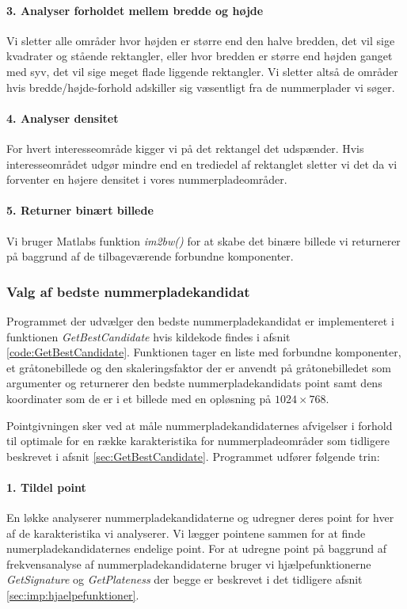 \paragraph{3. Analyser forholdet mellem bredde og højde}
Vi sletter alle områder hvor højden er større end den halve bredden, det vil sige kvadrater og stående rektangler, eller hvor bredden er større end højden ganget med syv, det vil sige meget flade liggende rektangler. Vi sletter altså de områder hvis bredde/højde-forhold adskiller sig væsentligt fra de nummerplader vi søger.

\paragraph{4. Analyser densitet}
For hvert interesseområde kigger vi på det rektangel det udspænder. Hvis interesseområdet udgør mindre end en trediedel af rektanglet sletter vi det da vi forventer en højere densitet i vores nummerpladeområder.

\paragraph{5. Returner binært billede}
Vi bruger Matlabs funktion \textit{im2bw()} for at skabe det binære billede vi returnerer på baggrund af de tilbageværende forbundne komponenter. 

\subsubsection{Valg af bedste nummerpladekandidat}
\label{sec:imp:GetBestCandidate}
Programmet der udvælger den bedste nummerpladekandidat er implementeret i funktionen \textit{GetBestCandidate} hvis kildekode findes i afsnit \vref{code:GetBestCandidate}. Funktionen tager en liste med forbundne komponenter, et gråtonebillede og den skaleringsfaktor der er anvendt på gråtonebilledet som argumenter og returnerer den bedste nummerpladekandidats point samt dens koordinater som de er i et billede med en opløsning på $1024 \times 768$. 

Pointgivningen sker ved at måle nummerpladekandidaternes afvigelser i forhold til optimale for en række karakteristika for nummerpladeområder som tidligere beskrevet i afsnit \vref{sec:GetBestCandidate}.
Programmet udfører følgende trin:

\paragraph{1. Tildel point}
En løkke analyserer nummerpladekandidaterne og udregner deres point for hver af de karakteristika vi analyserer. Vi lægger pointene sammen for at finde numerpladekandidaternes endelige point. For at udregne point på baggrund af frekvensanalyse af nummerpladekandidaterne bruger vi hjælpefunktionerne \textit{GetSignature} og \textit{GetPlateness} der begge er beskrevet i det tidligere afsnit \vref{sec:imp:hjaelpefunktioner}. 

